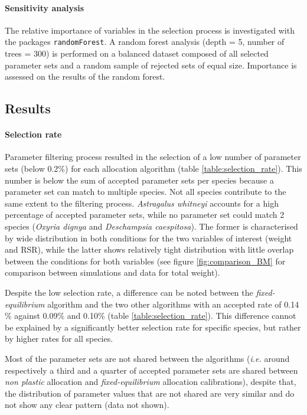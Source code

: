 \paragraph{Sensitivity analysis}
The relative importance of variables in the selection process is investigated with the packages \texttt{randomForest}. A random forest analysis (depth = 5, number of trees = 300) is performed on a balanced dataset composed of all selected parameter sets and a random sample of rejected sets of equal size. Importance is assessed on the results of the random forest.

\subsection{Results}

\paragraph{Selection rate}
Parameter filtering process resulted in the selection of a low number of parameter sets (below 0.2\%) for each allocation algorithm (table \ref{table:selection_rate}). This number is below the sum of accepted parameter sets per species because a parameter set can match to multiple species. Not all species contribute to the same extent to the filtering process. \textit{Astragalus whitneyi} accounts for a high percentage of accepted parameter sets, while no parameter set could match 2 species (\textit{Oxyria dignya} and \textit{Deschampsia caespitosa}). The former is characterised by wide distribution in both conditions for the two variables of interest (weight and RSR), while the latter shows relatively tight distribution with little overlap between the conditions for both variables (see figure \ref{fig:comparison_BM} for comparison between simulations and data for total weight).


Despite the low selection rate, a difference can be noted between the \textit{fixed-equilibrium} algorithm and the two other algorithms with an accepted rate of 0.14 \% against 0.09\% and 0.10\% (table \ref{table:selection_rate}). This difference cannot be explained by a significantly better selection rate for specific species, but rather by higher rates for all species.

Most of the parameter sets are not shared between the algorithms (\textit{i.e.} around respectively a third and a quarter of accepted parameter sets are shared between \textit{non plastic} allocation and \textit{fixed-equilibrium} allocation calibrations), despite that, the distribution of parameter values that are not shared are very similar and do not show any clear pattern (data not shown).

